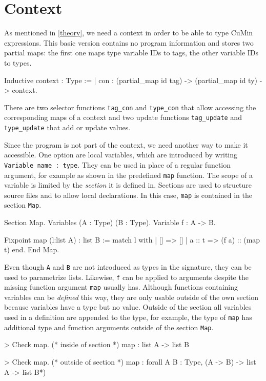 \documentclass[paper = a4, fleqn, twoside]{scrreprt}
\newcommand{\coqinline}[1]{\texttt{#1}}
\begin{document}
\section{Context}
As mentioned in \autoref{theory}, we need a context in order to be able to type CuMin expressions. This basic version contains no program information and stores two partial maps: the first one maps type variable IDs to tags, the other variable IDs to types. 
\begin{coqcode}
Inductive context : Type := 
  | con : (partial_map id tag) -> (partial_map id ty) -> context.
\end{coqcode}
There are two selector functions \texttt{tag\_con} and \texttt{type\_con} that allow accessing the corresponding maps of a context and two update functions \coqinline{tag_update} and \coqinline{type_update} that add or update values.
\par
Since the program is not part of the context, we need another way to make it accessible. One option are local variables, which are introduced by writing \coqinline{Variable name : type}. They can be used in place of a regular function argument, for example as shown in the predefined \coqinline{map} function. The scope of a variable is limited by the \textit{section} it is defined in. Sections are used to structure source files and to allow local declarations. In this case, \texttt{map} is contained in the section \texttt{Map}.
\begin{coqcode}
Section Map.
  Variables (A : Type) (B : Type).
  Variable f : A -> B.
  
  Fixpoint map (l:list A) : list B :=
    match l with
    | [] => []
    | a :: t => (f a) :: (map t)
    end.
End Map.
\end{coqcode}
Even though \coqinline{A} and \coqinline{B} are not introduced as types in the signature, they can be used to parametrize lists. Likewise, \coqinline{f} can be applied to arguments despite the missing function argument \coqinline{map} usually has. Although functions containing variables can be \textit{defined} this way, they are only usable outside of the own section because variables have a type but no value. Outside of the section all variables used in a definition are appended to the type, for example, the type of \texttt{map} has additional type and function arguments outside of the section \texttt{Map}.
\begin{coqcode}
> Check map. (* inside of section *)
map : list A -> list B

> Check map. (* outside of section *)
map : forall A B : Type, (A -> B) -> list A -> list B*)
\end{coqcode}
\end{document}
